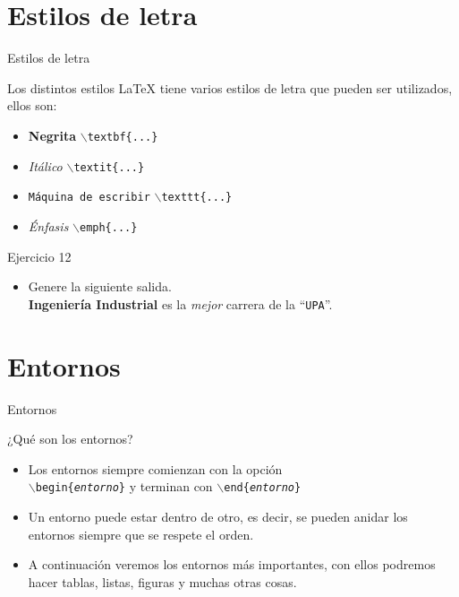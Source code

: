 \documentclass[10pt]{beamer}
\begin{document}
\section{Estilos de letra}

\begin{frame}{Estilos de letra}
\begin{block}{Los distintos estilos}
\LaTeX{} tiene varios estilos de letra que pueden ser utilizados, ellos son: \\
\begin{itemize}
\item \textbf{Negrita} \texttt{$\backslash$textbf\{...\}}
\item \textit{Itálico} \texttt{$\backslash$textit\{...\}}
\item \texttt{Máquina de escribir} \texttt{$\backslash$texttt\{...\}}
\item \emph{Énfasis} \texttt{$\backslash$emph\{...\}}
\end{itemize}
\end{block}

\begin{exampleblock}{Ejercicio 12}
\begin{itemize}
\item Genere la siguiente salida. \\
\textbf{Ingeniería Industrial} es la \textit{mejor} carrera de la ``\texttt{UPA}''. \\
\end{itemize}
\end{exampleblock}
\end{frame}

\section{Entornos}

\begin{frame}{Entornos}
\begin{block}{¿Qué son los entornos?}
\begin{itemize}
\item Los entornos siempre comienzan con la opción \\
\texttt{$\backslash$begin\{\emph{entorno}\}} y terminan con \texttt{$\backslash$end\{\emph{entorno}\}}
\item Un entorno puede estar dentro de otro, es decir, se pueden anidar los entornos siempre que se respete el orden.
\item A continuación veremos los entornos más importantes, con ellos podremos hacer tablas, listas, figuras y muchas otras cosas.
\end{itemize}
\end{block}
\end{frame}
\end{document}
